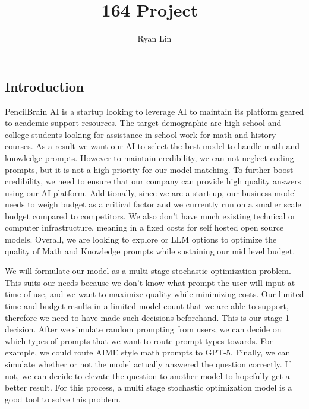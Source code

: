 \documentclass{report}
\title{\Huge{164 Project}\ }
\author{\huge{Ryan Lin}}
\date{}
\begin{document}
\maketitle
\newpage%
\tableofcontents
\pagebreak

\chapter{}
\section{Introduction}

PencilBrain AI is a startup looking to leverage AI to maintain its platform geared to academic support resources. The target demographic are high school and college students looking for assistance in school work for math and history courses. As a result we want our AI to select the best model to handle math and knowledge prompts. However to maintain credibility, we can not neglect coding prompts, but it is not a high priority for our model matching. To further boost credibility, we need to ensure that our company can provide high quality answers using our AI platform. Additionally, since we are a start up, our business model needs to weigh budget as a critical factor and we currently run on a smaller scale budget compared to competitors. We also don’t have much existing technical or computer infrastructure, meaning in a fixed costs for self hosted open source models.  Overall, we are looking to explore or LLM options to optimize the quality of Math and Knowledge prompts while sustaining our mid level budget.  

	We will formulate our model as a multi-stage stochastic optimization problem. This suits our needs because we don’t know what prompt the user will input at time of use, and we want to maximize quality while minimizing costs. Our limited time and budget results in a limited model count that we are able to support, therefore we need to have made such decisions beforehand. This is our stage 1 decision. After we simulate random prompting from users, we can decide on which types of prompts that we want to route prompt types towards. For example, we could route AIME style math prompts to GPT-5. Finally, we can simulate whether or not the model actually answered the question correctly. If not, we can decide to elevate the question to another model to hopefully get a better result. For this process, a multi stage stochastic optimization model is a good tool to solve this problem. 
\end{document}
